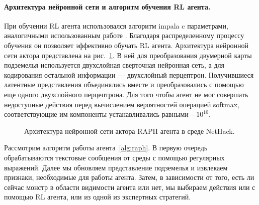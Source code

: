\paragraph{Архитектура нейронной сети и алгоритм обучения RL агента.} При обучении RL агента использовался алгоритм impala \cite{impala} c параметрами, аналогичными использованным работе \cite{kuettler2020nethack}. Благодаря распределенному процессу обучения он позволяет эффективно обучать RL агента. Архитектура нейронной сети актора представлена на рис.~\ref{fig:raph_arch}. В ней для преобразования двумерной карты подземелья используется двухслойная сверточная нейронная сеть, а для кодирования остальной информации --- двухслойный перцептрон. Получившиеся латентные представления объединялись вместе и преобразовались с помощью еще одного двухслойного перцептрона. Для того чтобы агент не мог совершать недоступные действия перед вычислением вероятностей операцией softmax, соответствующие им компоненты устанавливались равными $-10^{10}$. 

\begin{figure}[ht]
\caption{Архитектура нейронной сети актора RAPH агента в среде NetHack.}
    \label{fig:raph_arch}
\end{figure}

Рассмотрим алгоритм работы агента~\ref{alg:raph}. В первую очередь обрабатываются текстовые сообщения от среды с помощью регулярных выражений. Далее мы обновляем представление подземелья и извлекаем признаки, необходимые для работы агента. Затем, в зависимости от того, есть ли сейчас монстр в области видимости агента или нет, мы выбираем действия или с помощью RL агента, или из одной из экспертных стратегий.


